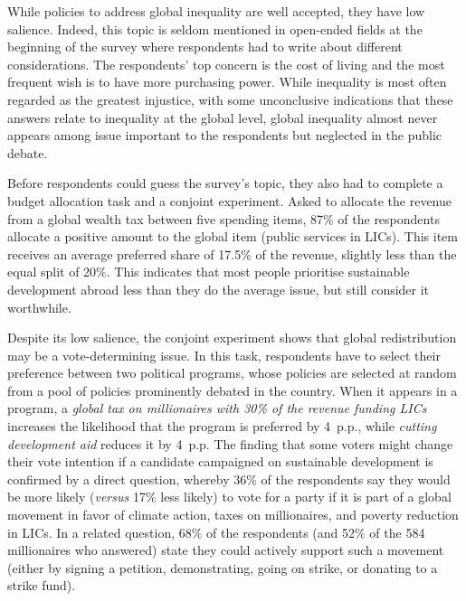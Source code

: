 \documentclass[12pt,english]{article}
\begin{document}
\begin{bibunit}
While policies to address global inequality are well accepted, they have low salience. Indeed, this topic is seldom mentioned in open-ended fields at the beginning of the survey where respondents had to write about different considerations. The respondents' top concern is the cost of living and the most frequent wish is to have more purchasing power. While inequality is most often regarded as the greatest injustice, with some unconclusive indications that these answers relate to inequality at the global level, global inequality almost never appears among issue important to the respondents but neglected in the public debate. 

Before respondents could guess the survey's topic, they also had to complete a budget allocation task and a conjoint experiment. Asked to allocate the revenue from a %
global wealth tax between five spending items, 87\% of the respondents allocate a positive amount to the global item (public services in LICs). This item receives an average preferred share of 17.5\% of the revenue, slightly less than the equal split of 20\%. %
This indicates that most people prioritise sustainable development abroad less than they do the average issue, but still consider it worthwhile. 

Despite its low salience, the conjoint experiment shows that global redistribution may be a vote-determining issue. In this task, respondents have to select their preference between two political programs, whose policies are selected at random from a pool of policies prominently debated in the country. When it appears in a program, a \textit{global tax on millionaires with 30\% of the revenue funding LICs} increases the likelihood that the program is preferred by 4~p.p., while \textit{cutting development aid} reduces it by 4~p.p. The finding that some voters might change their vote intention if a candidate campaigned on sustainable development is confirmed by a direct question, whereby 36\% of the respondents say they would be more likely (\textit{versus} 17\% less likely) to vote for a party if it is part of a global movement in favor of climate action, taxes on millionaires, and poverty reduction in LICs. In a related question, 68\% of the respondents (and 52\% of the 584 millionaires who answered) state they could actively support such a movement (either by signing a petition, demonstrating, going on strike, or donating to a strike fund). 


\end{bibunit}
\end{document}
